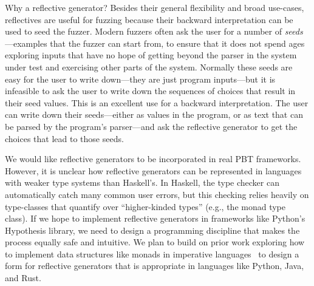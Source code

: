 Why a reflective generator? Besides their general flexibility and broad
use-cases, reflectives are useful for fuzzing because their backward
interpretation can be used to seed the fuzzer.
Modern fuzzers often
ask the user for a number of {\em seeds}---examples that the fuzzer
can start from,
to ensure that it does not spend ages exploring
inputs that have no hope of getting beyond the parser in the system
under test and exercising other parts of the system. Normally these
seeds are easy
for the user to write down---they are just program inputs---but
it is infeasible to ask the user to write down the sequences of choices that
result in their seed values.
This is an excellent use for a
backward interpretation. The user can write down their seeds---either as values
in the program, or as text that can be parsed by the program's parser---and
ask the reflective generator to get the choices that lead to those seeds.



%
We would like reflective generators to be incorporated in
real PBT frameworks.
%
However, it is unclear
how reflective generators can be
represented in languages with weaker type systems than Haskell's. In
Haskell, the type checker can automatically catch many
common user errors, but this checking relies heavily on type-classes that
quantify over ``higher-kinded types'' (e.g., the monad type class). If
we hope to implement
reflective generators in frameworks like Python's Hypothesis library, we need to
design a programming discipline that makes the process equally safe and
intuitive. We plan to build on prior work exploring how to implement data structures
like monads in imperative
languages~\cite{brachthauser_representing_2021, delaat_pymonad_nodate} to design
a form for reflective generators that is appropriate in languages like
Python, Java, and Rust.

